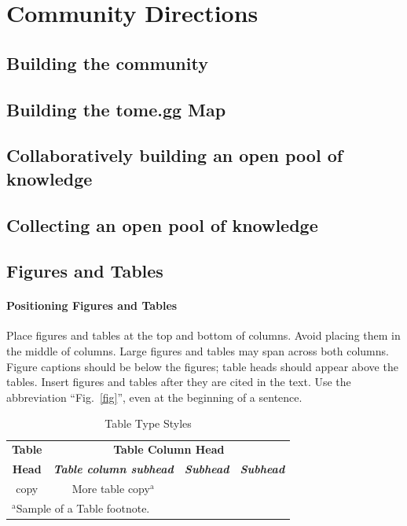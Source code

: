 \documentclass[journal, onecolumn]{IEEEtran}
\begin{document}
\section{Community Directions}
\label{sec:community_directions}

\subsection{Building the community}

\subsection{Building the tome.gg Map}

\subsection{Collaboratively building an open pool of knowledge}

\subsection{Collecting an open pool of knowledge}


\subsection{Figures and Tables}
\paragraph{Positioning Figures and Tables} Place figures and tables at the top and 
bottom of columns. Avoid placing them in the middle of columns. Large 
figures and tables may span across both columns. Figure captions should be 
below the figures; table heads should appear above the tables. Insert 
figures and tables after they are cited in the text. Use the abbreviation 
``Fig.~\ref{fig}'', even at the beginning of a sentence.

\begin{table}[htbp]
\caption{Table Type Styles}
\begin{center}
\begin{tabular}{|c|c|c|c|}
\hline
\textbf{Table}&\multicolumn{3}{|c|}{\textbf{Table Column Head}} \\
\cline{2-4} 
\textbf{Head} & \textbf{\textit{Table column subhead}}& \textbf{\textit{Subhead}}& \textbf{\textit{Subhead}} \\
\hline
copy& More table copy$^{\mathrm{a}}$& &  \\
\hline
\multicolumn{4}{l}{$^{\mathrm{a}}$Sample of a Table footnote.}
\end{tabular}
\label{tab1}
\end{center}
\end{table}
\end{document}

